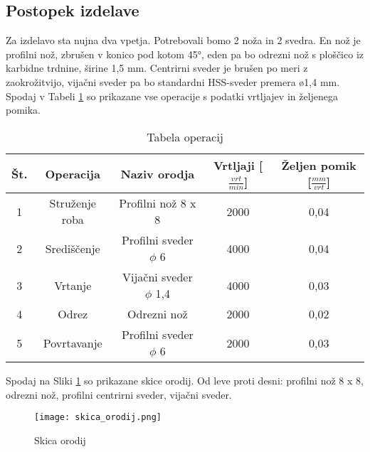\subsection{Postopek izdelave}
Za izdelavo sta nujna dva vpetja. Potrebovali bomo 2 noža in 2
svedra. En nož je profilni nož, zbrušen v konico pod kotom 45°, eden pa
bo odrezni nož s ploščico iz karbidne trdnine, širine 1,5 mm.
Centrirni sveder je brušen po meri z zaokrožitvijo, vijačni
sveder pa bo standardni HSS-sveder premera ø1,4 mm. Spodaj v Tabeli \ref{tabela_operacij}
so prikazane vse operacije s podatki vrtljajev in željenega pomika.

\begin{table}[H]
	\caption{Tabela operacij}
	\label{tabela_operacij}
	\begin{center}
		\begin{tabular}{|c|c|c|c|c|}
			\hline
			Št. & Operacija      & Naziv orodja              & Vrtljaji [\( \frac{vrt}{min}\)] & Željen pomik [\( \frac{mm}{vrt}\)] \\
			\hline
			1   & Struženje roba & Profilni nož 8 x 8        & 2000                            & 0,04                               \\
			\hline
			2   & Središčenje    & Profilni sveder $\phi$ 6  & 4000                            & 0,04                               \\
			\hline
			3   & Vrtanje        & Vijačni sveder $\phi$ 1,4 & 4000                            & 0,03                               \\
			\hline
			4   & Odrez          & Odrezni nož               & 2000                            & 0,02                               \\
			\hline
			5   & Povrtavanje    & Profilni sveder $\phi$ 6  & 2000                            & 0,03                               \\
			\hline
		\end{tabular}
	\end{center}

\end{table}

Spodaj na Sliki \ref{skica_orodij} so prikazane skice orodij.  Od leve proti desni: profilni nož 8 x 8,
odrezni nož, profilni centrirni sveder, vijačni sveder.

\begin{figure}[H]
	\begin{center}
		\texttt{[image: skica\_orodij.png]}
		\caption{Skica orodij
			\cite{lasten}}
		\label{skica_orodij}
	\end{center}
\end{figure}

